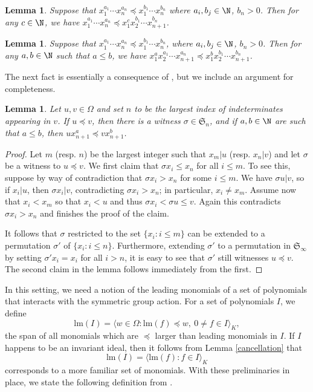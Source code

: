\documentclass{amsart}
\newtheorem{lemma}[theorem]{Lemma}
\theoremstyle{definition}
\theoremstyle{remark}
\numberwithin{equation}{section}
\newcommand{\<}{\langle}
\renewcommand{\>}{\rangle}
\begin{document}
\begin{lemma}\label{oneshiftuplem}
Suppose that $x_1^{a_1}\cdots x_n^{a_n} \preceq x_1^{b_1}\cdots
x_n^{b_n}$ where $a_i,b_j\in\N$, $b_n>0$. Then for any $c \in \N$, we
have $x_1^{a_1}\cdots x_n^{a_n} \preceq x_1^c x_2^{b_1}\cdots
x_{n+1}^{b_n}$.
\end{lemma}

\begin{lemma}\label{twoshiftuplem}
  Suppose that $x_1^{a_1}\cdots x_n^{a_n} \preceq x_1^{b_1}\cdots x_n^{b_n}$,
  where $a_i,b_j\in\N$, $b_n>0$.   Then for any $a,b \in \N$ such that $a
  \leq b$, we have  $x_1^ax_2^{a_1}\cdots x_{n+1}^{a_n} \preceq
  x_1^bx_2^{b_1}\cdots x_{n+1}^{b_{n}}$.
\end{lemma}

The next fact is essentially a consequence of \cite[Lemma 2.14]{AH},
but we include an argument for completeness.  

\begin{lemma}\label{addtoendlem}
Let $u,v \in \Omega$ and set $n$ to be the largest index of indeterminates
appearing in $v$.  If $u \preceq v$, then there is a witness $\sigma \in {\mathfrak S}_n$,
and if $a,b \in \N$ are such that $a \leq b$, then $u x_{n+1}^{a} \preceq v x_{n+1}^{b}$.
\end{lemma}
\begin{proof}
Let $m$ (resp. $n$) be the largest integer such that $x_m | u$ (resp. $x_n | v$) 
and let $\sigma$ be a witness to $u \preceq v$.  
We first claim that $\sigma x_i \leq  x_n$ for all $i \leq m$.  To see this, suppose 
by way of contradiction that $\sigma x_i > x_n$ for some $i \leq m$. 
We have $\sigma u|v$, so if $x_i | u$, then
$\sigma x_i | v$, contradicting $\sigma x_i>x_n$; in particular, $x_i \neq x_m$. 
Assume now that $x_i<x_m$ so that $x_i < u$ and thus $\sigma x_i < \sigma u \leq  v$. 
Again this contradicts $\sigma x_i> x_n$ and finishes the proof of the claim.

It follows that $\sigma$ restricted to the set $\{x_i : i \leq m\}$ can be extended to a 
permutation $\sigma'$ of
$\{x_i : i \leq n\}$.  Furthermore, extending $\sigma'$ to a permutation in ${\mathfrak S}_\infty$
by setting $\sigma' x_i=x_i$ for all $i > n$, it is easy to see that 
$\sigma'$ still witnesses $u \preceq v$. 
The second claim in the lemma follows immediately from the first.
\end{proof}

In this setting, we need a notion of the leading monomials of a
set of polynomials that interacts with the symmetric group action.
For a set of polynomials $I$, we define
\[ \text{lm}(I) = \< w \in \Omega :  \text{lm}(f) \preceq w, \ 0 \neq f \in I\>_K,\]
the span of all monomials which are $\preceq$ larger than leading monomials
in $I$.  If $I$ happens to be an invariant ideal, then it follows from
Lemma \ref{cancellation} that \[\text{lm}(I) = \<\text{lm}(f): f \in I \>_K\] corresponds
to a more familiar set of monomials.  With these preliminaries in
place, we state the following definition from \cite{AH}.
\end{document}
